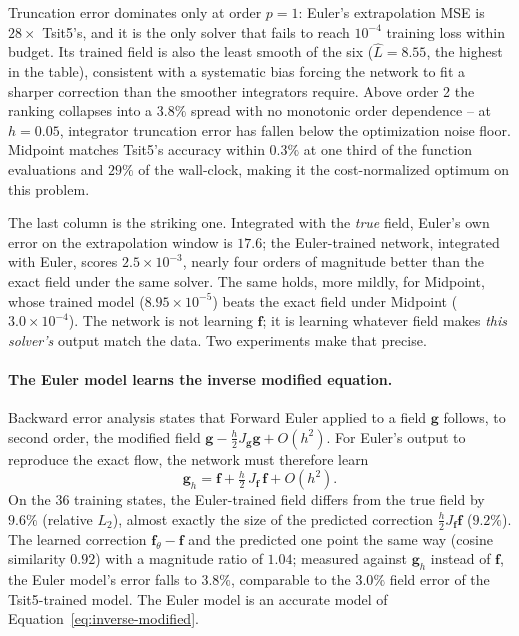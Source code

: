 Truncation error dominates only at order $p=1$: Euler's extrapolation MSE is
$28\times$ Tsit5's, and it is the only solver that fails to reach $10^{-4}$
training loss within budget. Its trained field is also the least smooth of
the six ($\hat L=8.55$, the highest in the table), consistent with a
systematic bias forcing the network to fit a sharper correction than the
smoother integrators require. Above order 2 the ranking collapses into a
$3.8\%$ spread with no monotonic order dependence -- at $h=0.05$,
integrator truncation error has fallen below the optimization noise floor.
Midpoint matches Tsit5's accuracy within $0.3\%$ at one third of the
function evaluations and $29\%$ of the wall-clock, making it the
cost-normalized optimum on this problem.

The last column is the striking one. Integrated with the \emph{true} field,
Euler's own error on the extrapolation window is $17.6$; the Euler-trained
network, integrated with Euler, scores $2.5\times10^{-3}$, nearly four orders
of magnitude better than the exact field under the same solver. The same
holds, more mildly, for Midpoint, whose trained model ($8.95\times10^{-5}$)
beats the exact field under Midpoint ($3.0\times10^{-4}$). The network is
not learning $\mathbf{f}$; it is learning whatever field makes
\emph{this solver's} output match the data. Two experiments make that
precise.

\paragraph{The Euler model learns the inverse modified equation.} Backward
error analysis states that Forward Euler applied to a field $\mathbf{g}$
follows, to second order, the modified field
$\mathbf{g}-\tfrac{h}{2}J_{\mathbf{g}}\mathbf{g}+O(h^2)$. For Euler's output
to reproduce the exact flow, the network must therefore learn
\begin{equation}
\mathbf{g}_h=\mathbf{f}+\tfrac{h}{2}\,J_{\mathbf{f}}\,\mathbf{f}+O(h^2).
\label{eq:inverse-modified}
\end{equation}
On the 36 training states, the Euler-trained field differs from the true
field by $9.6\%$ (relative $L_2$), almost exactly the size of the predicted
correction $\tfrac{h}{2}J_{\mathbf{f}}\mathbf{f}$ ($9.2\%$). The learned
correction $\mathbf{f}_\theta-\mathbf{f}$ and the predicted one point the
same way (cosine similarity $0.92$) with a magnitude ratio of $1.04$; measured
against $\mathbf{g}_h$ instead of $\mathbf{f}$, the Euler model's error falls
to $3.8\%$, comparable to the $3.0\%$ field error of the Tsit5-trained
model. The Euler model is an accurate model of Equation~\ref{eq:inverse-modified}.

